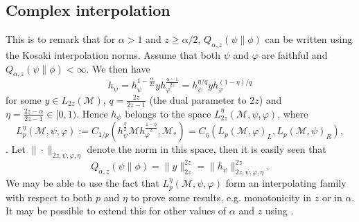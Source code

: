 \documentclass[12pt]{article}
\theoremstyle{definition}
\theoremstyle{remark}
\def\Me{\mathcal M}
\begin{document}
\subsection{Complex interpolation}

This is to remark that for $\alpha>1$ and $z\ge \alpha/2$, $Q_{\alpha,z}(\psi\|\phi)$ can be
written using the Kosaki interpolation  norms. Assume that both $\psi$ and $\varphi$ are
faithful and $Q_{\alpha,z}(\psi\|\phi)<\infty$.  We then have
\[
h_\psi=h_\psi^{1-\frac{\alpha}{2z}}yh_\varphi^{\frac{\alpha-1}{2z}}=h_{\psi}^{\eta/q}yh_\varphi^{(1-\eta)/q}
\]
for some $y\in L_{2z}(\Me)$, $q=\frac{2z}{2z-1}$ (the dual parameter to $2z$) and
$\eta=\frac{2z-\alpha}{2z-1}\in [0,1)$. Hence
 $h_\psi$ belongs to the space
$L_{2z}^\eta(\Me,\psi,\varphi)$, where
\[
L_p^\eta(\Me,\psi,\varphi):=
C_{1/p}(h_\psi^{\frac{\eta}2}\Me h_\varphi^{\frac{1-\eta}2},\Me_*)=C_\eta(L_p(\Me,\varphi)_L,L_p(\Me,\psi)_R),
\]
\cite[Thm. 11.1]{kosaki1984applications}. Let $\|\cdot\|_{2z,\psi,\varphi,\eta}$ denote the norm in
this space, then  it is easily seen that 
\[
Q_{\alpha,z}(\psi\|\phi)=\|y\|_{2z}^{2z}=\|h_\psi\|^{2z}_{2z,\psi,\varphi,\eta}.
\]
We may be able to use the fact that $L_p^\eta(\Me,\psi,\varphi)$ form an interpolating
family with respect to  both $p$ and $\eta$ to prove some results, e.g. monotonicity in
$z$ or in $\alpha$. It may be possible to extend this for other values of $\alpha$ and
$z$ using \cite{gu2019interpolation}.



%
%
\end{document}
